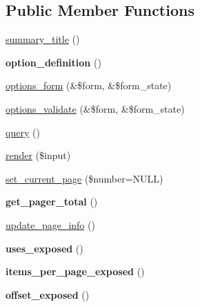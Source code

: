 \subsection*{Public Member Functions}
\begin{DoxyCompactItemize}
\item 
\hyperlink{classviews__plugin__pager__full_af727d597c4029f7f11721871f7b9c839}{summary\_\-title} ()
\item 
\hypertarget{classviews__plugin__pager__full_afd830623def5a17647c6b922905369c8}{
{\bfseries option\_\-definition} ()}
\label{classviews__plugin__pager__full_afd830623def5a17647c6b922905369c8}

\item 
\hyperlink{classviews__plugin__pager__full_a4f3bcc9bc5ab8ddbbcacdce3108dcfd7}{options\_\-form} (\&\$form, \&\$form\_\-state)
\item 
\hyperlink{classviews__plugin__pager__full_a00fca2bdd3dfda2bea07b01a6f8384a4}{options\_\-validate} (\&\$form, \&\$form\_\-state)
\item 
\hyperlink{classviews__plugin__pager__full_a97cf3d3a2a632da5a5efbea9b344b236}{query} ()
\item 
\hyperlink{classviews__plugin__pager__full_a1832939d6ea8c80e643cb94bae96daf8}{render} (\$input)
\item 
\hyperlink{classviews__plugin__pager__full_a503e0a6ea9e4815d712d36b1911d61bb}{set\_\-current\_\-page} (\$number=NULL)
\item 
\hypertarget{classviews__plugin__pager__full_aca8807993d495569281c7a0521beef37}{
{\bfseries get\_\-pager\_\-total} ()}
\label{classviews__plugin__pager__full_aca8807993d495569281c7a0521beef37}

\item 
\hyperlink{classviews__plugin__pager__full_acb15b273f383e8cad63658d4dec52db0}{update\_\-page\_\-info} ()
\item 
\hypertarget{classviews__plugin__pager__full_a9d2a32c14e8e39ed163535320ac1c142}{
{\bfseries uses\_\-exposed} ()}
\label{classviews__plugin__pager__full_a9d2a32c14e8e39ed163535320ac1c142}

\item 
\hypertarget{classviews__plugin__pager__full_aaa93c417647215673a6f47b3192a75fa}{
{\bfseries items\_\-per\_\-page\_\-exposed} ()}
\label{classviews__plugin__pager__full_aaa93c417647215673a6f47b3192a75fa}

\item 
\hypertarget{classviews__plugin__pager__full_ae647c98bcaeb0cc10e7bb3fb11f680a0}{
{\bfseries offset\_\-exposed} ()}
\label{classviews__plugin__pager__full_ae647c98bcaeb0cc10e7bb3fb11f680a0}


\end{DoxyCompactItemize}
